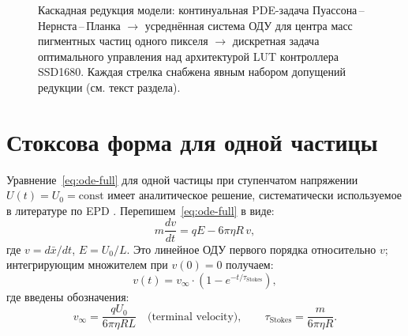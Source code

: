 \begin{figure}[H]
    \caption{Каскадная редукция модели: континуальная PDE-задача
        Пуассона\,--\,Нернста\,--\,Планка $\to$ усреднённая система ОДУ для
        центра масс пигментных частиц одного пикселя $\to$ дискретная задача
        оптимального управления над архитектурой LUT контроллера SSD1680.
        Каждая стрелка снабжена явным набором допущений редукции (см. текст
        раздела).}
    \label{fig:model-reduction}
\end{figure}
\FloatBarrier


\section{Стоксова форма для одной частицы}\label{sec:model-stokes}

Уравнение~\eqref{eq:ode-full} для одной частицы при ступенчатом напряжении
$U(t) = U_0 = \mathrm{const}$ имеет аналитическое решение, систематически
используемое в литературе по EPD
\cite{wang2022_red_ghost, he2020_particle_activation}. Перепишем~\eqref{eq:ode-full}
в виде:
\begin{equation}\label{eq:stokes-newton}
    m \frac{dv}{dt} = qE - 6\pi\eta R\, v,
\end{equation}
где $v = d\bar{x}/dt$, $E = U_0/L$. Это линейное ОДУ первого порядка
относительно $v$; интегрирующим множителем при $v(0) = 0$ получаем:
\begin{equation}\label{eq:v-of-t}
    v(t) = v_\infty \cdot \left(1 - e^{-t/\tau_{\mathrm{Stokes}}}\right),
\end{equation}
где введены обозначения:
\begin{equation}\label{eq:vinf-tau}
    v_\infty = \frac{qU_0}{6\pi\eta R L}
    \quad \text{(terminal velocity)},
    \qquad
    \tau_{\mathrm{Stokes}} = \frac{m}{6\pi\eta R}.
\end{equation}

